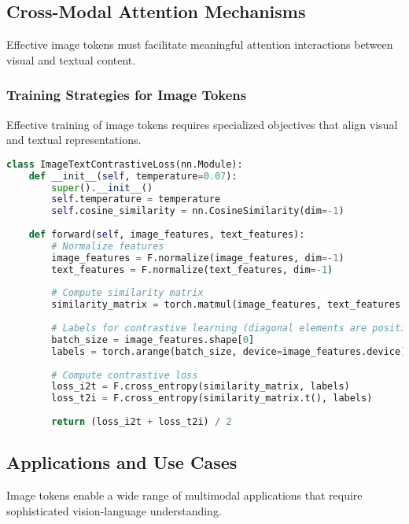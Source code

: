 \subsection{Cross-Modal Attention Mechanisms}

Effective image tokens must facilitate meaningful attention interactions between visual and textual content.

\subsubsection{Training Strategies for Image Tokens}

Effective training of image tokens requires specialized objectives that align visual and textual representations.

\begin{lstlisting}[language=Python, caption=Contrastive learning for image-text alignment]
class ImageTextContrastiveLoss(nn.Module):
    def __init__(self, temperature=0.07):
        super().__init__()
        self.temperature = temperature
        self.cosine_similarity = nn.CosineSimilarity(dim=-1)
    
    def forward(self, image_features, text_features):
        # Normalize features
        image_features = F.normalize(image_features, dim=-1)
        text_features = F.normalize(text_features, dim=-1)
        
        # Compute similarity matrix
        similarity_matrix = torch.matmul(image_features, text_features.t()) / self.temperature
        
        # Labels for contrastive learning (diagonal elements are positive pairs)
        batch_size = image_features.shape[0]
        labels = torch.arange(batch_size, device=image_features.device)
        
        # Compute contrastive loss
        loss_i2t = F.cross_entropy(similarity_matrix, labels)
        loss_t2i = F.cross_entropy(similarity_matrix.t(), labels)
        
        return (loss_i2t + loss_t2i) / 2
\end{lstlisting}

\subsection{Applications and Use Cases}

Image tokens enable a wide range of multimodal applications that require sophisticated vision-language understanding.

